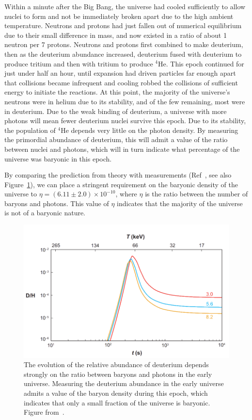 Within a minute after the Big Bang, the universe had cooled sufficiently to allow nuclei to form and not be immediately broken apart due to the high ambient temperature. Neutrons and protons had just fallen out of numerical equilibrium due to their small difference in mass, and now existed in a ratio of about 1 neutron per 7 protons. Neutrons and protons first combined to make deuterium, then as the deuterium abundance increased, deuterium fused with deuterium to produce tritium and then with tritium to produce $^4$He. This epoch continued for just under half an hour, until expansion had driven particles far enough apart that collisions became infrequent and cooling robbed the collisions of sufficient energy to initiate the reactions. At this point, the majority of the universe's neutrons were in helium due to its stability, and of the few remaining, most were in deuterium. Due to the weak binding of deuterium, a universe with more photons will mean fewer deuterium nuclei survive this epoch. Due to its stability, the population of $^4$He depends very little on the photon density. By measuring the primordial abundance of deuterium, this will admit a value of the ratio between nuclei and photons, which will in turn indicate what percentage of the universe was baryonic in this epoch.

By comparing the prediction from theory with measurements (Ref~\cite{Steigman:2007xt}, see also Figure~\ref{fig:bbn}), we can place a stringent requirement on the baryonic density of the universe to $\eta = (6.11\pm2.0)\times10^{-10}$, where $\eta$ is the ratio between the number of baryons and photons. This value of $\eta$ indicates that the majority of the universe is not of a baryonic nature.

\begin{figure}[htbp]
\centering
    \includegraphics[width=\textwidth]{figures/dm/bbn_eta}
    \caption{The evolution of the relative abundance of deuterium depends strongly on the ratio between baryons and photons in the early universe. Measuring the deuterium abundance in the early universe admits a value of the baryon density during this epoch, which indicates that only a small fraction of the universe is baryonic. Figure from~\cite{Steigman:2007xt}.}\label{fig:bbn}
\end{figure}

